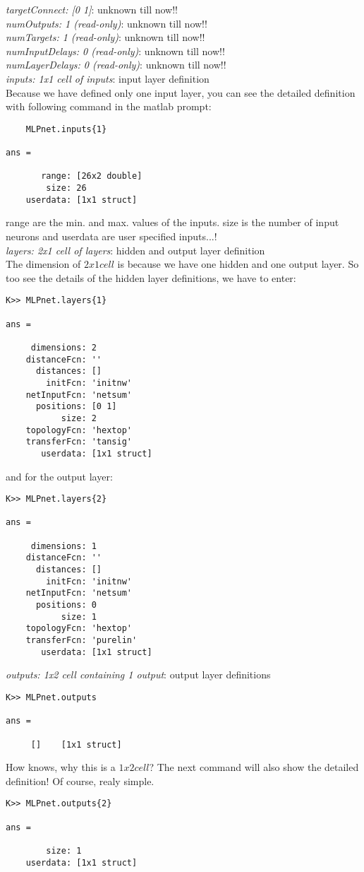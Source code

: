 \noindent \textit{targetConnect: [0 1]}: unknown till now!!\\
\noindent \textit{numOutputs: 1  (read-only)}: unknown till now!!\\
\noindent \textit{numTargets: 1  (read-only)}: unknown till now!!\\
\noindent \textit{numInputDelays: 0  (read-only)}: unknown till now!!\\
\noindent \textit{numLayerDelays: 0  (read-only)}: unknown till now!!\\
\noindent \textit{inputs: {1x1 cell} of inputs}: input layer definition\\
Because we have defined only one input layer, you can see the detailed definition with
following command in the matlab prompt:\\
\begin{verbatim}
	MLPnet.inputs{1}

ans = 

       range: [26x2 double]
        size: 26
    userdata: [1x1 struct]
\end{verbatim}
range are the min. and max. values of the inputs. size is the number of input neurons and userdata are user specified inputs...!\\
\noindent \textit{layers: {2x1 cell} of layers}: hidden and output layer definition\\
The dimension of $2x1 cell$ is because we have one hidden and one output layer. So too see the details of the hidden layer definitions, we have to enter:
\begin{verbatim}
K>> MLPnet.layers{1}

ans = 

     dimensions: 2
    distanceFcn: ''
      distances: []
        initFcn: 'initnw'
    netInputFcn: 'netsum'
      positions: [0 1]
           size: 2
    topologyFcn: 'hextop'
    transferFcn: 'tansig'
       userdata: [1x1 struct]
\end{verbatim}
and for the output layer:
\begin{verbatim}
K>> MLPnet.layers{2}

ans = 

     dimensions: 1
    distanceFcn: ''
      distances: []
        initFcn: 'initnw'
    netInputFcn: 'netsum'
      positions: 0
           size: 1
    topologyFcn: 'hextop'
    transferFcn: 'purelin'
       userdata: [1x1 struct]
\end{verbatim}

\noindent \textit{outputs: {1x2 cell} containing 1 output}: output layer definitions\\
\begin{verbatim}
K>> MLPnet.outputs

ans = 

     []    [1x1 struct]
\end{verbatim}
How knows, why this is a $1x2 cell$? The next command will also show the detailed definition! Of course, realy simple.
\begin{verbatim}
K>> MLPnet.outputs{2}

ans = 

        size: 1
    userdata: [1x1 struct]
\end{verbatim} 

